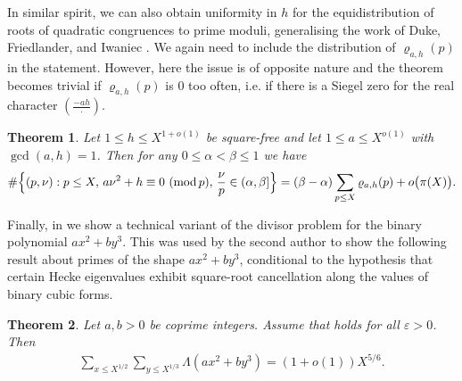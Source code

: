 \documentclass[12pt]{amsart}
\newtheorem{theorem}{Theorem}[section]
\theoremstyle{definition}
\theoremstyle{remark}
\numberwithin{equation}{section}
\newcommand{\1}{{\mathbf 1}}
\newcommand{\eps}{\varepsilon}
\renewcommand{\pmod}[1]{\,\,(\mathrm{mod}\,{#1})}
\begin{document}
In similar spirit, we can also obtain uniformity in $h$ for the equidistribution of roots of quadratic congruences to prime moduli, generalising the work of Duke, Friedlander, and Iwaniec \cite{DFIprimes}. We again need to include the distribution of $\varrho_{a,h}(p) $ in the statement. However, here the issue is of opposite nature and the theorem becomes trivial if $\varrho_{a,h}(p)$ is $0$ too often, i.e. if there is a Siegel zero for the real character $(\frac{-ah}{\cdot})$. 
\begin{theorem}\label{thm:roots}
    Let $1 \leq h\leq X^{1+o(1)}$ be square-free and let $1 \leq a\leq X^{o(1)}$ with $\gcd(a,h)=1$. Then for any $0\leq \alpha <\beta \leq 1$ we have
    \begin{align*}
   \# \Bigl\{(p,\nu): p\leq X, \, a\nu^2+h\equiv 0 \pmod{p}, \, \frac{\nu}{p} \in ( \alpha, \beta] \Bigr\} =  (\beta-\alpha) \sum_{p \leq X} \varrho_{a,h}(p) + o\bigl(\pi(X)\bigr) .
    \end{align*}
\end{theorem}


Finally, in \cite{GMquadratic} we show a technical variant of the divisor problem for the binary polynomial $ax^2+by^3$. This was used by the second author \cite{mx2y3} to show the following result about primes of the shape $ax^2+by^3$, conditional to the hypothesis that certain Hecke eigenvalues exhibit square-root cancellation along the values of binary cubic forms.
\begin{theorem}\label{thm:x2y3}   Let $a,b > 0$ be coprime integers. Assume that \cite[Conjecture $\mathrm{C}_a(\eps)$]{mx2y3} holds for all $\eps >0$.  Then 
    \begin{align*}
        \sum_{x \leq X^{1/2}} \sum_{y \leq X^{1/3}} \Lambda(ax^2+by^3) = (1+o(1)) X^{5/6}.
    \end{align*}
\end{theorem}
\end{document}
